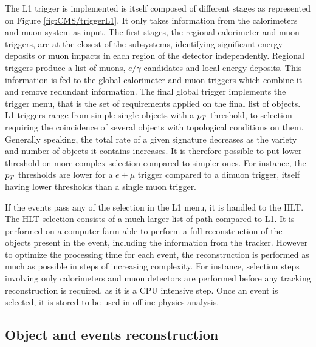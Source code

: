         The L1 trigger is implemented is itself composed of different stages as
        represented on Figure \ref{fig:CMS/triggerL1}. It only takes information from
        the calorimeters and muon system as input. The first stages, the regional calorimeter
        and muon triggers, are at the closest of the subsystems, identifying significant
        energy deposits or muon impacts in each region of the detector independently.
        Regional triggers produce a list of muons, $e/\gamma$ candidates and local energy
        deposits. This information is fed to the global calorimeter and muon triggers which
        combine it and remove redundant information. The final global trigger implements
        the trigger menu, that is the set of requirements applied on the final list of
        objects. L1 triggers range from simple single objects with a $p_T$ threshold, to
        selection requiring the coincidence of several objects with topological conditions
        on them. Generally speaking, the total rate of a given signature decreases as the
        variety and number of objects it contains increases. It is therefore possible to
        put lower threshold on more complex selection compared to simpler ones. For instance,
        the $p_T$ thresholds are lower for a $e+\mu$ trigger compared to a dimuon trigger,
        itself having lower thresholds than a single muon trigger.

        If the events pass any of the selection in the L1 menu, it is handled to the HLT.
        The HLT selection consists of a much larger list of path compared to L1.
        It is performed on a computer farm able to perform a full reconstruction
        of the objects present in the event, including the information from the tracker.
        However to optimize the processing time for each event, the reconstruction is
        performed as much as possible in steps of increasing complexity. For instance,
        selection steps involving only calorimeters and muon detectors are performed before
        any tracking reconstruction is required, as it is a CPU intensive step. Once
        an event is selected, it is stored to be used in offline physics analysis.

        \subsection{Object and events reconstruction}

